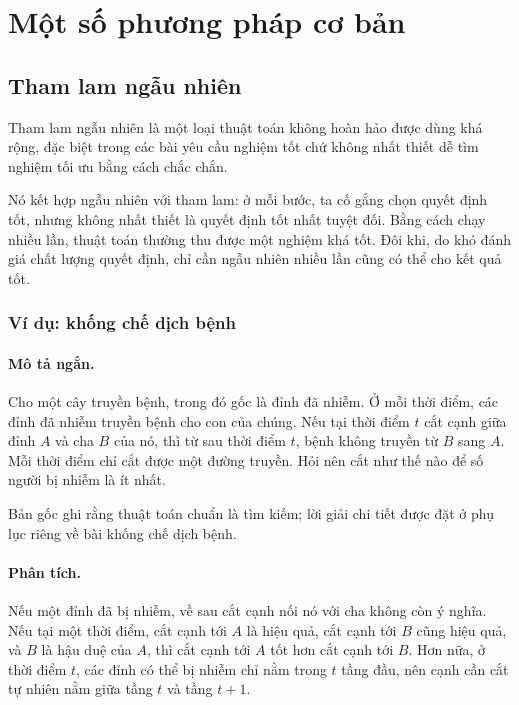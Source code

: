 \documentclass[11pt]{article}
\begin{document}
\section{Một số phương pháp cơ bản}

\subsection{Tham lam ngẫu nhiên}

Tham lam ngẫu nhiên là một loại thuật toán không hoàn hảo được dùng khá rộng,
đặc biệt trong các bài yêu cầu nghiệm tốt chứ không nhất thiết dễ tìm nghiệm
tối ưu bằng cách chắc chắn.

Nó kết hợp ngẫu nhiên với tham lam: ở mỗi bước, ta cố gắng chọn quyết định tốt,
nhưng không nhất thiết là quyết định tốt nhất tuyệt đối. Bằng cách chạy nhiều
lần, thuật toán thường thu được một nghiệm khá tốt. Đôi khi, do khó đánh giá
chất lượng quyết định, chỉ cần ngẫu nhiên nhiều lần cũng có thể cho kết quả
tốt.

\subsubsection{Ví dụ: khống chế dịch bệnh}

\paragraph{Mô tả ngắn.}
Cho một cây truyền bệnh, trong đó gốc là đỉnh đã nhiễm. Ở mỗi thời điểm, các
đỉnh đã nhiễm truyền bệnh cho con của chúng. Nếu tại thời điểm $t$ cắt cạnh
giữa đỉnh $A$ và cha $B$ của nó, thì từ sau thời điểm $t$, bệnh không truyền
từ $B$ sang $A$. Mỗi thời điểm chỉ cắt được một đường truyền. Hỏi nên cắt như
thế nào để số người bị nhiễm là ít nhất.

Bản gốc ghi rằng thuật toán chuẩn là tìm kiếm; lời giải chi tiết được đặt ở
phụ lục riêng về bài khống chế dịch bệnh.

\paragraph{Phân tích.}
Nếu một đỉnh đã bị nhiễm, về sau cắt cạnh nối nó với cha không còn ý nghĩa.
Nếu tại một thời điểm, cắt cạnh tới $A$ là hiệu quả, cắt cạnh tới $B$ cũng
hiệu quả, và $B$ là hậu duệ của $A$, thì cắt cạnh tới $A$ tốt hơn cắt cạnh tới
$B$. Hơn nữa, ở thời điểm $t$, các đỉnh có thể bị nhiễm chỉ nằm trong $t$ tầng
đầu, nên cạnh cần cắt tự nhiên nằm giữa tầng $t$ và tầng $t+1$.
\end{document}
